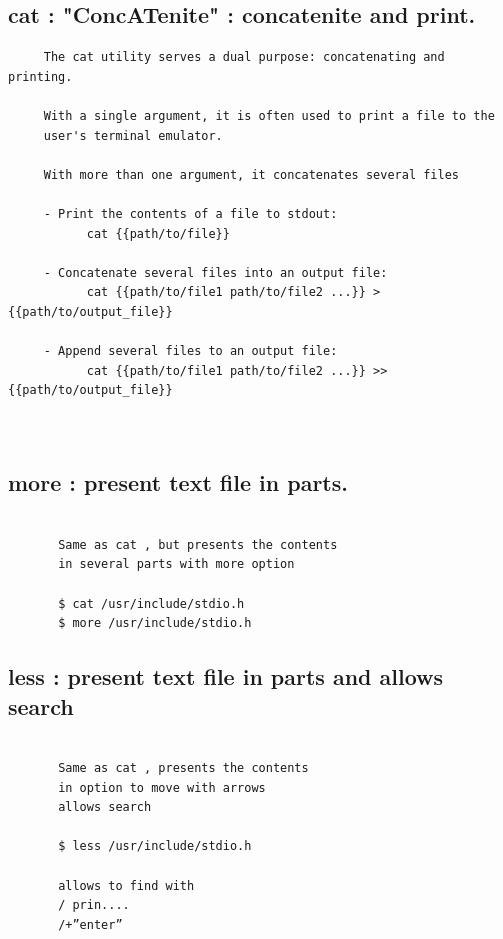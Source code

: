 \documentclass[a4paper,12pt]{article}
\begin{document}
\subsection{cat      : "ConcATenite" : concatenite and print.}
\begin{verbatim}
     The cat utility serves a dual purpose: concatenating and printing.
     
     With a single argument, it is often used to print a file to the 
     user's terminal emulator.
     
     With more than one argument, it concatenates several files

     - Print the contents of a file to stdout:
           cat {{path/to/file}}

     - Concatenate several files into an output file:
           cat {{path/to/file1 path/to/file2 ...}} > {{path/to/output_file}}

     - Append several files to an output file:
           cat {{path/to/file1 path/to/file2 ...}} >> {{path/to/output_file}}

    

\end{verbatim}

\subsection{more     : present text file in parts. }
\begin{verbatim}

       Same as cat , but presents the contents
       in several parts with more option
       
       $ cat /usr/include/stdio.h 
       $ more /usr/include/stdio.h 

\end{verbatim}

\subsection{less     : present text file in parts and allows search }
\begin{verbatim}
       
       Same as cat , presents the contents
       in option to move with arrows
       allows search
       
       $ less /usr/include/stdio.h

       allows to find with
       / prin....
       /+”enter”

\end{verbatim}
\end{document}
